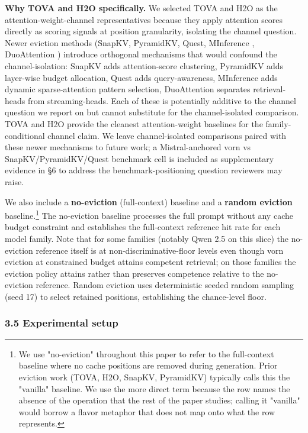 \documentclass[
]{article}
\begin{document}
\textbf{Why TOVA and H2O specifically.} We selected TOVA and
H2O as the attention-weight-channel representatives because they
apply attention scores directly as scoring signals at position
granularity, isolating the channel question. Newer eviction methods
(SnapKV, PyramidKV, Quest, MInference
\citep{jiang2024minference}, DuoAttention
\citep{xiao2024duoattention}) introduce orthogonal
mechanisms that would confound the channel-isolation: SnapKV adds
attention-score clustering, PyramidKV adds layer-wise budget allocation,
Quest adds query-awareness, MInference adds dynamic sparse-attention
pattern selection, DuoAttention separates retrieval-heads from
streaming-heads. Each of these is potentially additive to the channel
question we report on but cannot substitute for the channel-isolated
comparison. TOVA and H2O provide the cleanest
attention-weight baselines for the family-conditional channel claim. We
leave channel-isolated comparisons paired with these newer mechanisms to
future work; a Mistral-anchored vorn vs SnapKV/PyramidKV/Quest benchmark
cell is included as supplementary evidence in §6 to address the
benchmark-positioning question reviewers may raise.

We also include a \textbf{no-eviction} (full-context) baseline and a
\textbf{random eviction} baseline.\footnote{We use "no-eviction"
  throughout this paper to refer to the full-context baseline where no
  cache positions are removed during generation. Prior eviction work
  (TOVA, H2O, SnapKV, PyramidKV) typically calls this the "vanilla"
  baseline. We use the more direct term because the row names the
  absence of the operation that the rest of the paper studies; calling
  it "vanilla" would borrow a flavor metaphor that does not map onto
  what the row represents.} The no-eviction baseline processes the full
prompt without any cache budget constraint and establishes the
full-context reference hit rate for each model family. Note that for
some families (notably Qwen 2.5 on this slice) the
no-eviction reference itself is at non-discriminative-floor levels even
though vorn eviction at constrained budget attains
competent retrieval; on those families the eviction policy attains
rather than preserves competence relative to the no-eviction reference.
Random eviction uses deterministic seeded random sampling (seed 17) to
select retained positions, establishing the chance-level floor.

\subsubsection{3.5 Experimental setup}\label{35-experimental-setup}
\end{document}
